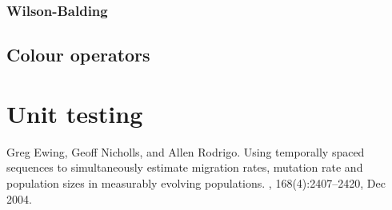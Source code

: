 \documentclass[a4paper,11pt]{paper}
\begin{document}
\subsubsection{Wilson-Balding}

\subsection{Colour operators}

\section{Unit testing}


%
%

\begin{thebibliography}{1}

Greg Ewing, Geoff Nicholls, and Allen Rodrigo.
\newblock Using temporally spaced sequences to simultaneously estimate
  migration rates, mutation rate and population sizes in measurably evolving
  populations.
, 168(4):2407--2420, Dec 2004.

\end{thebibliography}
\end{document}
